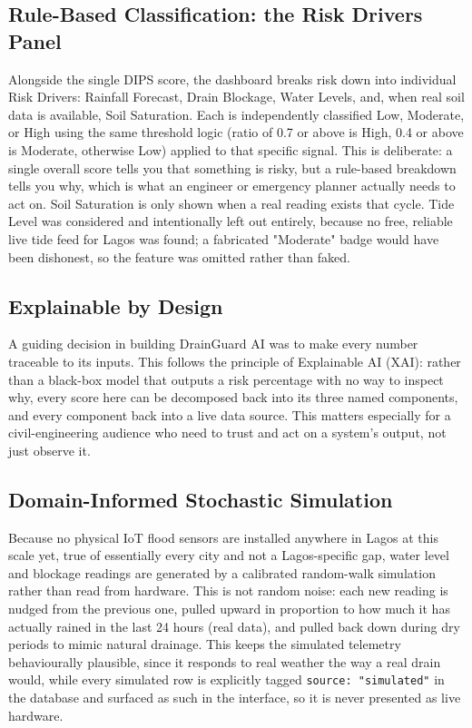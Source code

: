 \documentclass[11pt]{article}
\begin{document}
\subsection{Rule-Based Classification: the Risk Drivers Panel}
Alongside the single DIPS score, the dashboard breaks risk down into individual Risk Drivers: Rainfall Forecast, Drain Blockage, Water Levels, and, when real soil data is available, Soil Saturation. Each is independently classified Low, Moderate, or High using the same threshold logic (ratio of 0.7 or above is High, 0.4 or above is Moderate, otherwise Low) applied to that specific signal. This is deliberate: a single overall score tells you that something is risky, but a rule-based breakdown tells you why, which is what an engineer or emergency planner actually needs to act on. Soil Saturation is only shown when a real reading exists that cycle. Tide Level was considered and intentionally left out entirely, because no free, reliable live tide feed for Lagos was found; a fabricated "Moderate" badge would have been dishonest, so the feature was omitted rather than faked.

\subsection{Explainable by Design}
A guiding decision in building DrainGuard AI was to make every number traceable to its inputs. This follows the principle of Explainable AI (XAI): rather than a black-box model that outputs a risk percentage with no way to inspect why, every score here can be decomposed back into its three named components, and every component back into a live data source. This matters especially for a civil-engineering audience who need to trust and act on a system's output, not just observe it.

\subsection{Domain-Informed Stochastic Simulation}
Because no physical IoT flood sensors are installed anywhere in Lagos at this scale yet, true of essentially every city and not a Lagos-specific gap, water level and blockage readings are generated by a calibrated random-walk simulation rather than read from hardware. This is not random noise: each new reading is nudged from the previous one, pulled upward in proportion to how much it has actually rained in the last 24 hours (real data), and pulled back down during dry periods to mimic natural drainage. This keeps the simulated telemetry behaviourally plausible, since it responds to real weather the way a real drain would, while every simulated row is explicitly tagged \texttt{source: "simulated"} in the database and surfaced as such in the interface, so it is never presented as live hardware.
\end{document}
